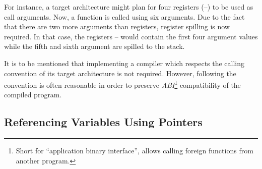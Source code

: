 For instance, a target architecture might plan for four registers (--) to be used as call arguments.
Now, a function is called using six arguments.
Due to the fact that there are two more arguments than registers, register spilling is now required.
In that case, the registers -- would contain the first four argument values while the fifth and sixth argument are spilled to the stack.
%

It is to be mentioned that implementing a compiler which respects the calling convention of its target architecture is not required.
However, following the convention is often reasonable in order to preserve \emph{ABI}\footnote{Short for \enquote{application binary interface}, allows calling foreign functions from another program.} compatibility of the compiled program.

\subsection{Referencing Variables Using Pointers}\label{sec:pointers}


